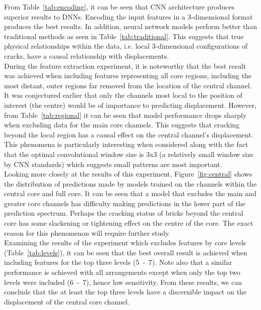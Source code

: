 \noindent
From Table~\ref{tab:encoding}, it can be seen that CNN architecture produces superior results to DNNs. Encoding the input features in a 3-dimensional format produces the best results. In addition, neural network models perform better than traditional methods as seen in Table~\ref{tab:traditional}. This suggests that true physical relationships within the data, i.e. local 3-dimensional configurations of cracks, have a causal relationship with displacements.
\\

\noindent
During the feature extraction experiment, it is noteworthy that the best result was achieved when including features representing all core regions, including the most distant, outer regions far removed from the location of the central channel. It was conjectured earlier that only the channels most local to the position of interest (the centre) would be of importance to predicting displacement. However, from Table~\ref{tab:regional} it can be seen that model performance drops sharply when excluding data for the main core channels. This suggests that cracking beyond the local region has a causal effect on the central channel's displacement. This phenomena is particularly interesting when considered along with the fact that the optimal convolutional window size is 3x3 (a relatively small window size by CNN standards) which suggests small patterns are most important.
\\

\noindent
Looking more closely at the results of this experiment, Figure~\ref{fig:central} shows the distribution of predictions made by models trained on the channels within the central core and full core. It can be seen that a model that excludes the main and greater core channels has difficulty making predictions in the lower part of the prediction spectrum. Perhaps the cracking status of bricks beyond the central core has some slackening or tightening effect on the centre of the core. The exact reason for this phenomenon will require further study.
\\

\noindent
Examining the results of the experiment which excludes features by core levels (Table~\ref{tab:levels}), it can be seen that the best overall result is achieved when including features for the top three levels (5~-~7). Note also that a similar performance is achieved with all arrangements except when only the top two levels were included (6~-~7), hence low sensitivity. From these results, we can conclude that the at least the top three levels have a discernible impact on the displacement of the central core channel.
\\

